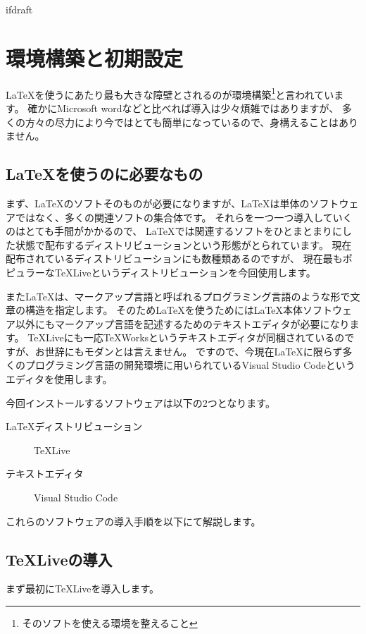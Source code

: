 \expandafter\ifx\csname ifdraft\endcsname\relax
    
    \graphicspath{{./figure/}}

\fi

\chapter{環境構築と初期設定}
	\LaTeX を使うにあたり最も大きな障壁とされるのが環境構築\footnote{そのソフトを使える環境を整えること}と言われています。
	確かにMicrosoft wordなどと比べれば導入は少々煩雑ではありますが、
	多くの方々の尽力により今ではとても簡単になっているので、身構えることはありません。

	\section{\LaTeX を使うのに必要なもの}
		まず、\LaTeX のソフトそのものが必要になりますが、\LaTeX は単体のソフトウェアではなく、多くの関連ソフトの集合体です。
		それらを一つ一つ導入していくのはとても手間がかかるので、
		\LaTeX では関連するソフトをひとまとまりにした状態で配布するディストリビューションという形態がとられています。
		現在配布されているディストリビューションにも数種類あるのですが、
		現在最もポピュラーな\TeX Liveというディストリビューションを今回使用します。

		また\LaTeX は、マークアップ言語と呼ばれるプログラミング言語のような形で文章の構造を指定します。
		そのため\LaTeX を使うためには\LaTeX 本体ソフトウェア以外にもマークアップ言語を記述するためのテキストエディタが必要になります。
		\TeX Liveにも一応\TeX Worksというテキストエディタが同梱されているのですが、お世辞にもモダンとは言えません。
		ですので、今現在\LaTeX に限らず多くのプログラミング言語の開発環境に用いられているVisual Studio Codeというエディタを使用します。

		今回インストールするソフトウェアは以下の2つとなります。
		\begin{description}
		    \item[\LaTeX ディストリビューション] \TeX Live
		    \item[テキストエディタ] Visual Studio Code
		\end{description}
		これらのソフトウェアの導入手順を以下にて解説します。

	\section{\TeX Liveの導入}
        まず最初に\TeX Liveを導入します。
        
